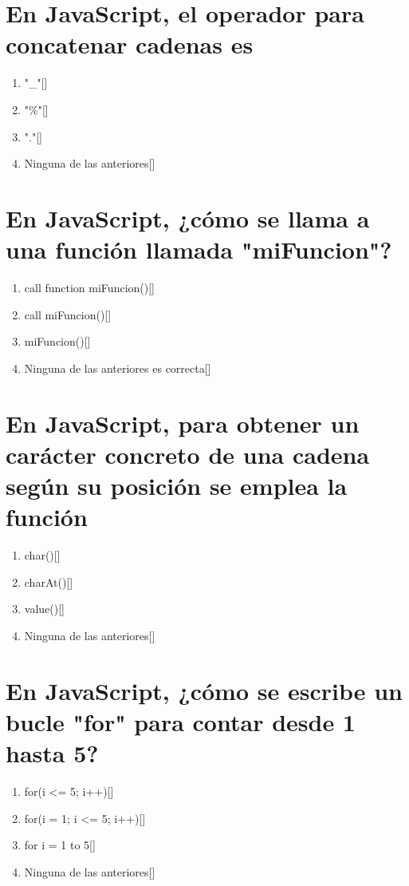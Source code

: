 \documentclass[addpoints, 12]{exam}{article}
\begin{document}
\section{En JavaScript, el operador para concatenar cadenas es}
\label{sec:org8331f78}
\begin{enumerate}
\item "\_"[]
\item "\%"[]
\item "."[]
\item Ninguna de las anteriores[]
\end{enumerate}

\section{En JavaScript, ¿cómo se llama a una función llamada "miFuncion"?}
\label{sec:org680f923}
\begin{enumerate}
\item call function miFuncion()[]
\item call miFuncion()[]
\item miFuncion()[]
\item Ninguna de las anteriores es correcta[]
\end{enumerate}

\section{En JavaScript, para obtener un carácter concreto de una cadena según su posición se emplea la función}
\label{sec:orgdefe601}
\begin{enumerate}
\item char()[]
\item charAt()[]
\item value()[]
\item Ninguna de las anteriores[]
\end{enumerate}

\section{En JavaScript, ¿cómo se escribe un bucle "for" para contar desde 1 hasta 5?}
\label{sec:org16543c4}
\begin{enumerate}
\item for(i <= 5; i++)[]
\item for(i = 1; i <= 5; i++)[]
\item for i = 1 to 5[]
\item Ninguna de las anteriores[]
\end{enumerate}
\end{document}
